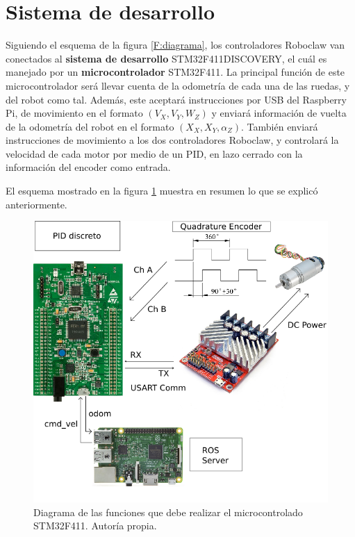 \section{Sistema de desarrollo}

Siguiendo el esquema de la figura \ref{F:diagrama}, los controladores Roboclaw van conectados al \textbf{sistema de desarrollo} STM32F411DISCOVERY, el cuál es manejado por un \textbf{microcontrolador} STM32F411. La principal función de este microcontrolador será llevar cuenta de la odometría de cada una de las ruedas, y del robot como tal. Además, este aceptará instrucciones por USB del Raspberry Pi, de movimiento en el formato $(V_X, V_Y, W_Z)$ y enviará información de vuelta de la odometría del robot en el formato $(X_X, X_Y, \alpha_Z)$. También enviará instrucciones de movimiento a los dos controladores Roboclaw, y controlará la velocidad de cada motor por medio de un PID, en lazo cerrado con la información del encoder como entrada.

El esquema mostrado en la figura \ref{F:diagrama_stm} muestra en resumen lo que se explicó anteriormente.

\begin{figure}[H]
\centering
\includegraphics[scale=0.5]{imagenes/microcontrolador_diagrama.png}
\caption{Diagrama de las funciones que debe realizar el microcontrolado STM32F411. Autoría propia.}
\label{F:diagrama_stm}
\end{figure}

